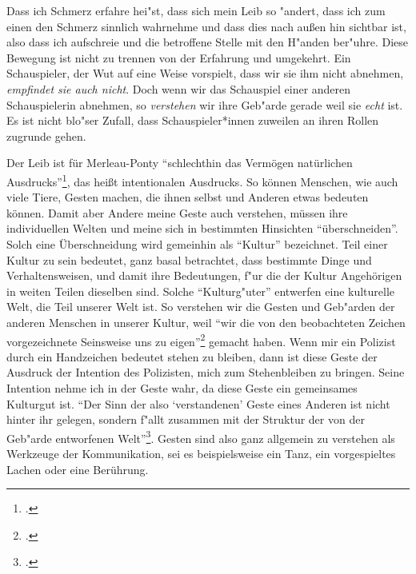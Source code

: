 \documentclass[a4paper, 12pt]{article}
\begin{document}
\begin{onehalfspace}
Dass ich Schmerz erfahre hei"st, dass sich mein Leib so "andert, dass ich zum einen den Schmerz sinnlich wahrnehme und dass dies nach außen hin sichtbar ist, also dass ich aufschreie und die betroffene Stelle mit den H"anden ber"uhre. Diese Bewegung ist nicht zu trennen von der Erfahrung und umgekehrt. Ein Schauspieler, der Wut auf eine Weise vorspielt, dass wir sie ihm nicht abnehmen, \emph{empfindet sie auch nicht}. Doch wenn wir das Schauspiel einer anderen Schauspielerin abnehmen, so \emph{verstehen} wir ihre Geb"arde gerade weil sie \emph{echt} ist. Es ist nicht blo"ser Zufall, dass Schauspieler*innen zuweilen an ihren Rollen zugrunde gehen. 

Der Leib ist für Merleau-Ponty "`schlechthin das Vermögen natürlichen Ausdrucks"'\footnote{\Cite[Siehe][S. 215]{merleau1966phanomenologie}.}, das heißt intentionalen Ausdrucks. So können Menschen, wie auch viele Tiere, Gesten machen, die ihnen selbst und Anderen etwas bedeuten können. Damit aber Andere meine Geste auch verstehen, müssen ihre individuellen Welten und meine sich in bestimmten Hinsichten "`überschneiden"'. Solch eine Überschneidung wird gemeinhin als "`Kultur"' bezeichnet. Teil einer Kultur zu sein bedeutet, ganz basal betrachtet, dass bestimmte Dinge und Verhaltensweisen, und damit ihre Bedeutungen, f"ur die der Kultur Angehörigen in weiten Teilen dieselben sind. Solche "`Kulturg"uter"' entwerfen eine kulturelle Welt, die Teil unserer Welt ist. So verstehen wir die Gesten und Geb"arden der anderen Menschen in unserer Kultur, weil "`wir die von den beobachteten Zeichen vorgezeichnete Seinsweise uns zu eigen"'\footnote{\Cite[Siehe][S. 370]{merleau1966phanomenologie}.} gemacht haben. Wenn mir ein Polizist durch ein Handzeichen bedeutet stehen zu bleiben, dann ist diese Geste der Ausdruck der Intention des Polizisten, mich zum Stehenbleiben zu bringen. Seine Intention nehme ich in der Geste wahr, da diese Geste ein gemeinsames Kulturgut ist. "`Der Sinn der also `verstandenen' Geste eines Anderen ist nicht hinter ihr gelegen, sondern f"allt zusammen mit der Struktur der von der Geb"arde entworfenen Welt"'\footnote{\Cite[Siehe][S. 220]{merleau1966phanomenologie}.}. Gesten sind also ganz allgemein zu verstehen als Werkzeuge der Kommunikation, sei es beispielsweise ein Tanz, ein vorgespieltes Lachen oder eine Berührung.


\end{onehalfspace}
\end{document}
